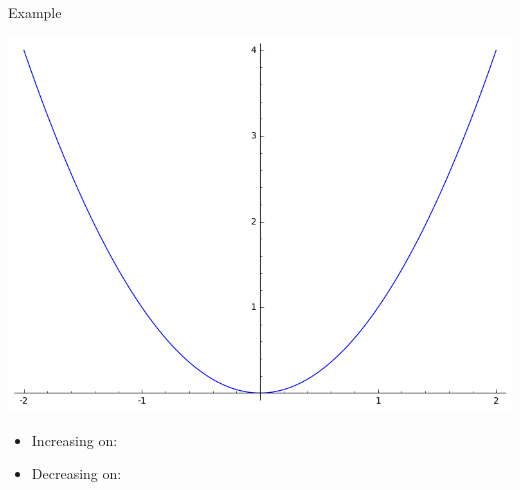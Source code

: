 \documentclass{beamer}
\theoremstyle{definition}
\begin{document}
\begin{frame}{Example}
  \begin{center}
    \includegraphics[scale=0.25]{imgs/parabola.png}
  \end{center}
  \begin{itemize}
  \item<2->
    Increasing on: 
  \item<2->
    Decreasing on: 
  \end{itemize}
\end{frame}
\end{document}
